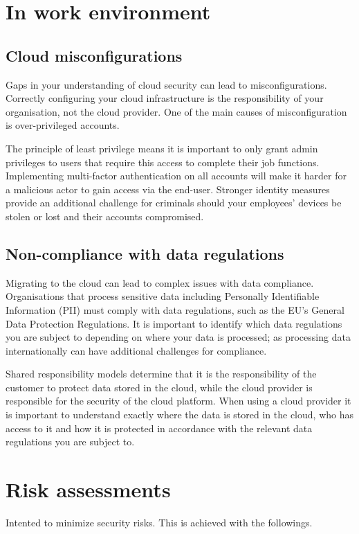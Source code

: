 \documentclass[a4paper,12pt]{book}
\begin{document}
\section{In work environment}

\subsection{Cloud misconfigurations}

Gaps in your understanding of cloud security can lead to misconfigurations. Correctly configuring your cloud infrastructure is the responsibility of your organisation, not the cloud provider. One of the main causes of misconfiguration is over-privileged accounts. 

The principle of least privilege means it is important to only grant admin privileges to users that require this access to complete their job functions. Implementing multi-factor authentication on all accounts will make it harder for a malicious actor to gain access via the end-user. Stronger identity measures provide an additional challenge for criminals should your employees’ devices be stolen or lost and their accounts compromised.


\subsection{Non-compliance with data regulations}

Migrating to the cloud can lead to complex issues with data compliance. Organisations that process sensitive data including Personally Identifiable Information (PII) must comply with data regulations, such as the EU’s General Data Protection Regulations. It is important to identify which data regulations you are subject to depending on where your data is processed; as processing data internationally can have additional challenges for compliance.

Shared responsibility models determine that it is the responsibility of the customer to protect data stored in the cloud, while the cloud provider is responsible for the security of the cloud platform. When using a cloud provider it is important to understand exactly where the data is stored in the cloud, who has access to it and how it is protected in accordance with the relevant data regulations you are subject to.

\section{Risk assessments}
Intented to minimize security risks. This is achieved with the followings.
\end{document}
